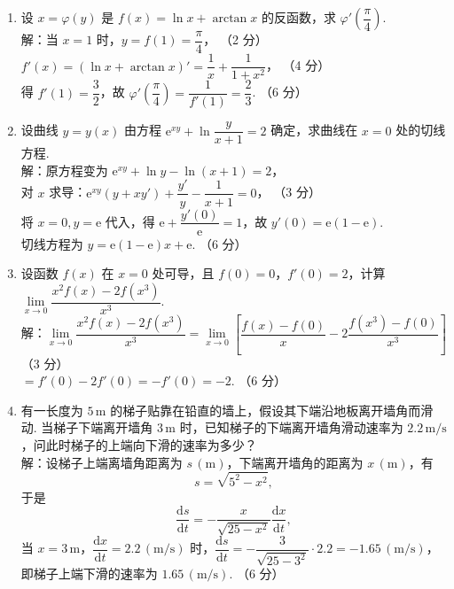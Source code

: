 \documentclass[a4paper,11pt]{ctexart}
\newcommand{\e}{\mathrm{e}}
\newcommand{\dd}{\mathrm{d}}
\newcommand{\score}[1]{\hfill（#1）}
\begin{document}
\begin{enumerate}[label=\arabic*., start=11, leftmargin=2em, itemsep=1.0em, topsep=0.5em]
  \item 设 $x = \varphi(y)$ 是 $f(x) = \ln x + \arctan x$ 的反函数，求 $\varphi'\left(\dfrac{\pi}{4}\right)$.\\[0.3em]
  解：当 $x = 1$ 时，$y = f(1) = \dfrac{\pi}{4}$， \score{2 分}\\[0.2em]
  $f'(x) = (\ln x + \arctan x)' = \dfrac{1}{x} + \dfrac{1}{1+x^2}$， \score{4 分}\\[0.2em]
  得 $f'(1) = \dfrac{3}{2}$，故 $\varphi'\left(\dfrac{\pi}{4}\right) = \dfrac{1}{f'(1)} = \dfrac{2}{3}$. \score{6 分}

  \item 设曲线 $y = y(x)$ 由方程 $\e^{xy} + \ln\dfrac{y}{x+1} = 2$ 确定，求曲线在 $x = 0$ 处的切线方程.\\[0.3em]
  解：原方程变为 $\e^{xy} + \ln y - \ln(x+1) = 2$，\\[0.2em]
  对 $x$ 求导：$\e^{xy}(y + xy') + \dfrac{y'}{y} - \dfrac{1}{x+1} = 0$， \score{3 分}\\[0.2em]
  将 $x = 0, y = \e$ 代入，得 $\e + \dfrac{y'(0)}{\e} = 1$，故 $y'(0) = \e(1 - \e)$.\\[0.2em]
  切线方程为 $y = \e(1 - \e)x + \e$. \score{6 分}

  \item 设函数 $f(x)$ 在 $x = 0$ 处可导，且 $f(0) = 0$，$f'(0) = 2$，计算 $\lim\limits_{x\to 0}\dfrac{x^2 f(x) - 2 f(x^3)}{x^3}$.\\[0.3em]
  解：$\lim\limits_{x\to 0}\dfrac{x^2 f(x) - 2 f(x^3)}{x^3} = \lim\limits_{x\to 0}\left[\dfrac{f(x) - f(0)}{x} - 2\dfrac{f(x^3) - f(0)}{x^3}\right]$ \score{3 分}\\[0.3em]
  $= f'(0) - 2f'(0) = -f'(0) = -2$. \score{6 分}

  \item 有一长度为 $5\,\mathrm{m}$ 的梯子贴靠在铅直的墙上，假设其下端沿地板离开墙角而滑动. 当梯子下端离开墙角 $3\,\mathrm{m}$ 时，已知梯子的下端离开墙角滑动速率为 $2.2\,\mathrm{m/s}$，问此时梯子的上端向下滑的速率为多少？\\[0.3em]
  解：设梯子上端离墙角距离为 $s\,(\mathrm{m})$，下端离开墙角的距离为 $x\,(\mathrm{m})$，有
  \[
    s = \sqrt{5^2 - x^2}, \tag*{（2 分）}
  \]
  于是
  \[
    \frac{\dd s}{\dd t} = -\frac{x}{\sqrt{25 - x^2}}\frac{\dd x}{\dd t}, \tag*{（4 分）}
  \]
  当 $x = 3\,\mathrm{m}$，$\dfrac{\dd x}{\dd t} = 2.2\,(\mathrm{m/s})$ 时，$\dfrac{\dd s}{\dd t} = -\dfrac{3}{\sqrt{25 - 3^2}} \cdot 2.2 = -1.65\,(\mathrm{m/s})$，\\[0.2em]
  即梯子上端下滑的速率为 $1.65\,(\mathrm{m/s})$. \score{6 分}


\end{enumerate}
\end{document}
